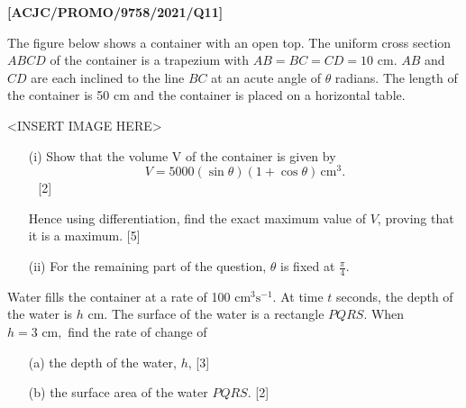 \item \textbf{{[}ACJC/PROMO/9758/2021/Q11{]}}

The figure below shows a container with an open top. The uniform cross
section $ABCD$ of the container is a trapezium with $AB=BC=CD=10$
cm. $AB$ and $CD$ are each inclined to the line $BC$ at an acute
angle of $\theta$ radians. The length of the container is 50 cm and
the container is placed on a horizontal table.
\noindent \begin{center}
<INSERT IMAGE HERE>
\par\end{center}
\begin{enumerate}
\item[(i)]  Show that the volume V of the container is given by 
\[
V=5000\left(\sin\theta\right)(1+\cos\theta)\,\text{cm}^{3}.
\]
\textcolor{white}{\_}\hfill{}{[}2{]}

Hence using differentiation, find the exact maximum value of $V$,
proving that it is a maximum. \hfill{}{[}5{]}
\item[(ii)]  For the remaining part of the question, $\theta$ is fixed at $\frac{\pi}{4}$. 
\end{enumerate}
Water fills the container at a rate of 100 $\text{cm}^{3}\text{s}^{-1}$.
At time $t$ seconds, the depth of the water is $h$ cm. The surface
of the water is a rectangle $PQRS$. When $h=3\text{ cm},$ find the
rate of change of 
\begin{enumerate}
\item[(a)]  the depth of the water, $h$, \hfill{}{[}3{]}
\item[(b)]  the surface area of the water $PQRS$. \hfill{}{[}2{]}
\end{enumerate}